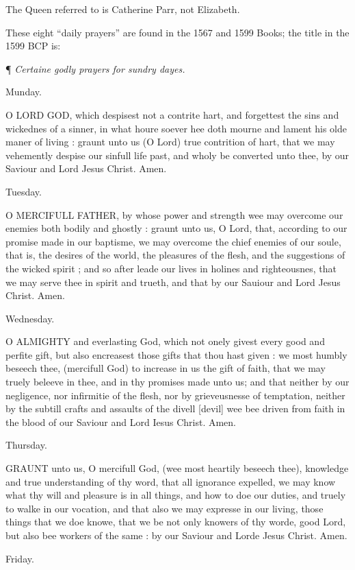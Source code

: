 The
Queen referred to is Catherine Parr, not Elizabeth.

These
eight ``daily prayers'' are found in the 1567 and 1599 Books;
the title in the 1599 BCP is:

¶ \emph{Certaine
godly prayers for sundry dayes.}

Munday.

O
LORD GOD, which despisest not a contrite hart, and forgettest the sins
and wickednes of a sinner, in what houre soever hee doth mourne and lament
his olde maner of living : graunt unto us (O Lord) true contrition of
hart, that we may vehemently despise our sinfull life past, and wholy
be converted unto thee, by our Saviour and Lord Jesus Christ. Amen.

Tuesday.

O
MERCIFULL FATHER, by whose power and strength wee may overcome our enemies
both bodily and ghostly : graunt unto us, O Lord, that, according to our
promise made in our baptisme, we may overcome the chief enemies of our
soule, that is, the desires of the world, the pleasures of the flesh,
and the suggestions of the wicked spirit ; and so after leade our lives
in holines and righteousnes, that we may serve thee in spirit and trueth,
and that by our Sauiour and Lord Jesus Christ. Amen.

Wednesday.

O
ALMIGHTY and everlasting God, which not onely givest every good and perfite
gift, but also encreasest those gifts that thou hast given : we most humbly
beseech thee, (mercifull God) to increase in us the gift of faith, that
we may truely beleeve in thee, and in thy promises made unto us; and that
neither by our negligence, nor infirmitie of the flesh, nor by grieveusnesse
of temptation, neither by the subtill crafts and assaults of the divell
[devil]
wee bee driven from faith in the blood of our Saviour and Lord Iesus Christ.
Amen.

Thursday.

GRAUNT
unto us, O mercifull God, (wee most heartily beseech thee), knowledge
and true understanding of thy word, that all ignorance expelled, we may
know what thy will and pleasure is in all things, and how to doe our duties,
and truely to walke in our vocation, and that also we may expresse in
our living, those things that we doe knowe, that we be not only knowers
of thy worde, good Lord, but also bee workers of the same : by our Saviour
and Lorde Jesus Christ. Amen.

Friday.

